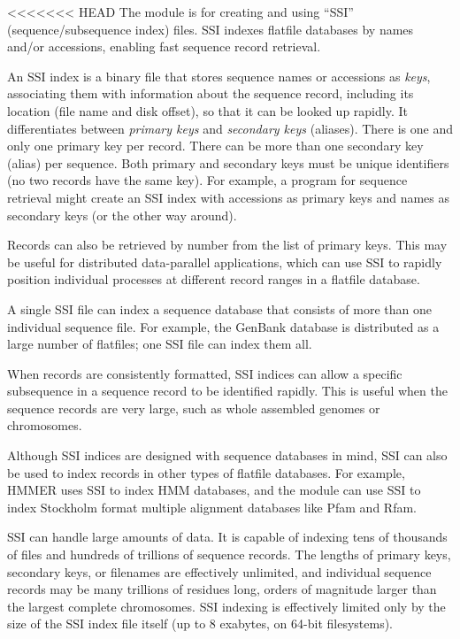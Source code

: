 <<<<<<< HEAD
The  module is for creating and using ``SSI''
(sequence/subsequence index) files. SSI indexes flatfile databases by
names and/or accessions, enabling fast sequence record retrieval. 

An SSI index is a binary file that stores sequence names or accessions
as \emph{keys}, associating them with information about the sequence
record, including its location (file name and disk offset), so that it
can be looked up rapidly. It differentiates between \emph{primary
keys} and \emph{secondary keys} (aliases).  There is one and only one
primary key per record. There can be more than one secondary key
(alias) per sequence. Both primary and secondary keys must be unique
identifiers (no two records have the same key). For example, a program
for sequence retrieval might create an SSI index with accessions as
primary keys and names as secondary keys (or the other way around).

Records can also be retrieved by number from the list of primary keys.
This may be useful for distributed data-parallel applications, which
can use SSI to rapidly position individual processes at different
record ranges in a flatfile database.

A single SSI file can index a sequence database that consists of more
than one individual sequence file. For example, the GenBank database
is distributed as a large number of flatfiles; one SSI file can index
them all.

When records are consistently formatted, SSI indices can allow a
specific subsequence in a sequence record to be identified
rapidly. This is useful when the sequence records are very large, such
as whole assembled genomes or chromosomes.

Although SSI indices are designed with sequence databases in mind, SSI
can also be used to index records in other types of flatfile
databases. For example, HMMER uses SSI to index HMM databases, and the
 module can use SSI to index Stockholm format multiple
alignment databases like Pfam and Rfam.

SSI can handle large amounts of data. It is capable of indexing tens
of thousands of files and hundreds of trillions of sequence records.
The lengths of primary keys, secondary keys, or filenames are
effectively unlimited, and individual sequence records may be many
trillions of residues long, orders of magnitude larger than the
largest complete chromosomes. SSI indexing is effectively limited only
by the size of the SSI index file itself (up to 8 exabytes, on 64-bit
filesystems).

